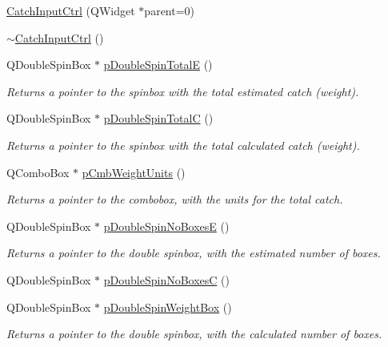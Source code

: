 \begin{DoxyCompactItemize}
\item 
\hyperlink{class_catch_input_ctrl_a63859ff45f4a6b69eab7f8355f874eef}{CatchInputCtrl} (QWidget $\ast$parent=0)
\item 
\hyperlink{class_catch_input_ctrl_a4fcd5654ee8fac680e4d60643c37b1f6}{$\sim$CatchInputCtrl} ()
\item 
QDoubleSpinBox $\ast$ \hyperlink{class_catch_input_ctrl_a9e39f1a825a9e291a13b087a0daf40d9}{pDoubleSpinTotalE} ()
\begin{DoxyCompactList}\small\item\em Returns a pointer to the spinbox with the total estimated catch (weight). \item\end{DoxyCompactList}\item 
QDoubleSpinBox $\ast$ \hyperlink{class_catch_input_ctrl_a7865c365c32bb490fd8e3666c0655680}{pDoubleSpinTotalC} ()
\begin{DoxyCompactList}\small\item\em Returns a pointer to the spinbox with the total calculated catch (weight). \item\end{DoxyCompactList}\item 
QComboBox $\ast$ \hyperlink{class_catch_input_ctrl_abdbba402a6fdea21753d1ea86e4171cc}{pCmbWeightUnits} ()
\begin{DoxyCompactList}\small\item\em Returns a pointer to the combobox, with the units for the total catch. \item\end{DoxyCompactList}\item 
QDoubleSpinBox $\ast$ \hyperlink{class_catch_input_ctrl_ae79037c9816c55c8861236bd729e8022}{pDoubleSpinNoBoxesE} ()
\begin{DoxyCompactList}\small\item\em Returns a pointer to the double spinbox, with the estimated number of boxes. \item\end{DoxyCompactList}\item 
QDoubleSpinBox $\ast$ \hyperlink{class_catch_input_ctrl_aa9e7192b483cf04b02ae050210882471}{pDoubleSpinNoBoxesC} ()
\item 
QDoubleSpinBox $\ast$ \hyperlink{class_catch_input_ctrl_ac97f9a25eea77708eb3e17557a1dc698}{pDoubleSpinWeightBox} ()
\begin{DoxyCompactList}\small\item\em Returns a pointer to the double spinbox, with the calculated number of boxes. \item\end{DoxyCompactList}\item 

\end{DoxyCompactItemize}
